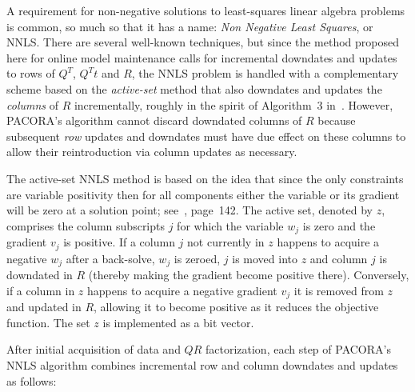 A requirement for non-negative solutions to least-squares linear algebra problems is common,
so much so that it has a name: \emph{Non Negative Least Squares}, or NNLS.
There are several well-known techniques\cite{ChPl},
but since the method proposed here for online model maintenance calls for
incremental downdates and updates to rows of $Q^T$, $Q^Tt$ and $R$,
the NNLS problem is handled with a complementary scheme
based on the \emph{active-set} method\cite{LaHa} that
also downdates and updates the \emph{columns} of $R$ incrementally,
roughly in the spirit of Algorithm~3 in~\cite{LuDu}.
However, PACORA's algorithm cannot discard downdated columns of $R$
because subsequent \emph{row} updates and downdates must have due effect
on these columns to allow their reintroduction via column updates as necessary.

The active-set NNLS method is based on the idea that since the only constraints are variable positivity
then for all components either the variable or its gradient will be zero at a solution point; see~\cite{BoVa}, page~142.
The active set, denoted by $z$, comprises the column subscripts $j$ for which the variable $w_j$ is zero and the gradient $v_j$ is positive.
If a column $j$ not currently in $z$ happens to acquire a negative $w_j$ after a back-solve, $w_j$ is zeroed,
$j$ is moved into $z$ and column $j$ is downdated in $R$ (thereby making the gradient become positive there).
Conversely, if a column in $z$ happens to acquire a negative gradient $v_j$ it is removed from $z$ and updated in $R$,
allowing it to become positive as it reduces the objective function.
The set $z$ is implemented as a bit vector.

After initial acquisition of data and $QR$ factorization, each step of PACORA's NNLS algorithm
combines incremental row and column downdates and updates as follows:

